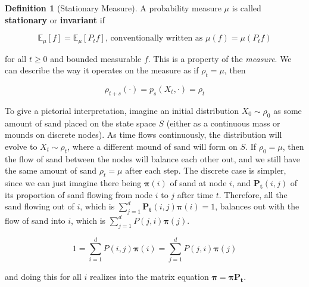 \documentclass{article}
\theoremstyle{definition}
\theoremstyle{remark}
\theoremstyle{definition}
\newtheorem{definition}{Definition}[section]
\begin{document}
    \begin{definition}[Stationary Measure]
      A probability measure $\mu$ is called \textbf{stationary} or \textbf{invariant} if 

        \[\mathbb{E}_\mu[f] = \mathbb{E}_\mu [P_t f] \text{, conventionally written as } \mu(f) = \mu(P_t f)\]

      for all $t \geq 0$ and bounded measurable $f$. This is a property of the \textit{measure}. We can describe the way it operates on the measure as if $\rho_t = \mu$, then 

        \[\rho_{t + s} (\cdot) = p_s (X_t, \cdot) = \rho_t\]
    \end{definition}

    To give a pictorial interpretation, imagine an initial distribution $X_0 \sim \rho_0$ as some amount of sand placed on the state space $S$ (either as a continuous mass or mounds on discrete nodes). As time flows continuously, the distribution will evolve to $X_t \sim \rho_t$, where a different mound of sand will form on $S$. If $\rho_0 = \mu$, then the flow of sand between the nodes will balance each other out, and we still have the same amount of sand $\rho_t = \mu$ after each step. The discrete case is simpler, since we can just imagine there being $\boldsymbol{\pi} (i)$ of sand at node $i$, and $\mathbf{P_t} (i, j)$ of its proportion of sand flowing from node $i$ to $j$ after time $t$. Therefore, all the sand flowing out of $i$, which is $\sum_{j=1}^d \mathbf{P_t} (i, j) \boldsymbol{\pi}(i) = 1$, balances out with the flow of sand into $i$, which is $\sum_{j=1}^d P(j, i) \boldsymbol{\pi}(j)$. 

      \[1 = \sum_{i=1}^d P(i, j) \boldsymbol{\pi}(i) = \sum_{j=1}^d P(j, i) \boldsymbol{\pi}(j)\]

    and doing this for all $i$ realizes into the matrix equation $\boldsymbol{\pi} = \boldsymbol{\pi} \mathbf{P_t}$. 
\end{document}
